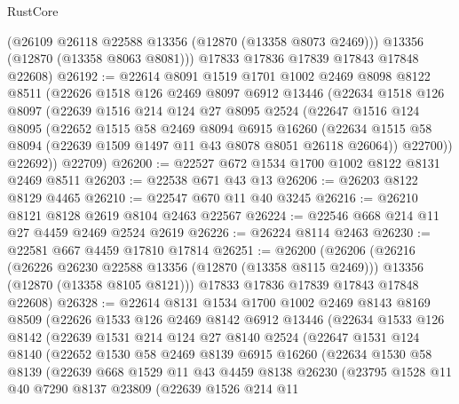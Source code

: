 \begin{lexlean}{RustCore}
\begin{coremodule}
        (@26109 @26118 @22588 @13356 (@12870 (@13358 @8073 @2469)))
        @13356
        (@12870 (@13358 @8063 @8081)))
      @17833
      @17836
      @17839
      @17843
      @17848
      @22608)
@26192 := @22614
    @8091
    @1519
    @1701
    @1002
    @2469
    @8098
    @8122
    @8511
    (@22626
      @1518
      @126
      @2469
      @8097
      @6912
      @13446
      (@22634
        @1518
        @126
        @8097
        (@22639
          @1516
          @214
          @124
          @27
          @8095
          @2524
          (@22647
            @1516
            @124
            @8095
            (@22652
              @1515
              @58
              @2469
              @8094
              @6915
              @16260
              (@22634 @1515 @58 @8094 (@22639 @1509 @1497 @11 @43 @8078 @8051 @26118 @26064))
              @22700))
          @22692))
      @22709)
@26200 := @22527 @672 @1534 @1700 @1002 @8122 @8131 @2469 @8511
@26203 := @22538 @671 @43 @13
@26206 := @26203 @8122 @8129 @4465
@26210 := @22547 @670 @11 @40 @3245
@26216 := @26210 @8121 @8128 @2619 @8104 @2463 @22567
@26224 := @22546 @668 @214 @11 @27 @4459 @2469 @2524 @2619
@26226 := @26224 @8114 @2463
@26230 := @22581 @667 @4459 @17810 @17814
@26251 := @26200
    (@26206
      (@26216
        (@26226 @26230 @22588 @13356 (@12870 (@13358 @8115 @2469)))
        @13356
        (@12870 (@13358 @8105 @8121)))
      @17833
      @17836
      @17839
      @17843
      @17848
      @22608)
@26328 := @22614
    @8131
    @1534
    @1700
    @1002
    @2469
    @8143
    @8169
    @8509
    (@22626
      @1533
      @126
      @2469
      @8142
      @6912
      @13446
      (@22634
        @1533
        @126
        @8142
        (@22639
          @1531
          @214
          @124
          @27
          @8140
          @2524
          (@22647
            @1531
            @124
            @8140
            (@22652
              @1530
              @58
              @2469
              @8139
              @6915
              @16260
              (@22634
                @1530
                @58
                @8139
                (@22639
                  @668
                  @1529
                  @11
                  @43
                  @4459
                  @8138
                  @26230
                  (@23795
                    @1528
                    @11
                    @40
                    @7290
                    @8137
                    @23809
                    (@22639
                      @1526
                      @214
                      @11

\end{coremodule}
\end{lexlean}
